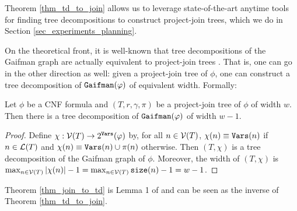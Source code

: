 Theorem \ref{thm_td_to_join} allows us to leverage state-of-the-art anytime tools for finding tree decompositions \cite{Tamaki17,strasser2017computing,AMW17} to construct project-join trees, which we do in Section \ref{sec_experiments_planning}.

On the theoretical front, it is well-known that tree decompositions of the Gaifman graph are actually equivalent to project-join trees \cite{MPPV04}.
That is, one can go in the other direction as well: given a project-join tree of $\phi$, one can construct a tree decomposition of $\texttt{\upshape Gaifman}(\varphi)$ of equivalent width.
Formally:
\begin{theorem}
\label{thm_join_to_td}
    Let $\phi$ be a CNF formula and $(T, r, \gamma, \pi)$ be a project-join tree of $\phi$ of width $w$.
    Then there is a tree decomposition of $\texttt{\upshape Gaifman}(\varphi)$ of width $w-1$.
\end{theorem}
\begin{proof}
    Define $\chi: \mathcal{V}(T) \to 2^{\texttt{\upshape Vars}}(\varphi)$ by, for all $n \in \mathcal{V}(T)$,
    $\chi(n) \equiv\texttt{\upshape Vars}(n)$ if $n \in \mathcal{L}(T)$ and $\chi(n) \equiv \texttt{\upshape Vars}(n) \cup \pi(n)$ otherwise.
    Then $(T, \chi)$ is a tree decomposition of the Gaifman graph of $\phi$.
    Moreover, the width of $(T, \chi)$ is $\max_{n \in \mathcal{V}(T)} \left| \chi (n) \right|  - 1 = \max_{n \in \mathcal{V}(T)} \texttt{\upshape size}(n) - 1 = w - 1$.
\end{proof}
Theorem \ref{thm_join_to_td} is Lemma 1 of \cite{MPPV04} and can be seen as the inverse of Theorem \ref{thm_td_to_join}.
